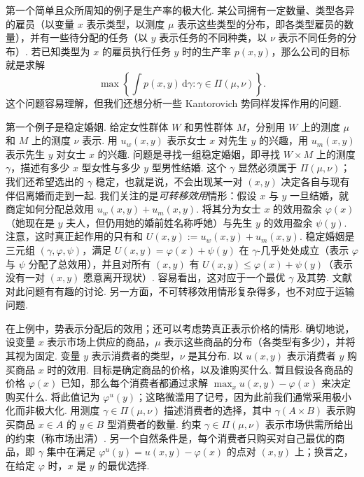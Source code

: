 第一个简单且众所周知的例子是生产率的极大化. 某公司拥有一定数量、类型各异的雇员（以变量 $x$ 表示类型，以测度 $\mu$ 表示这些类型的分布，即各类型雇员的数量），并有一些待分配的任务（以 $y$ 表示任务的不同种类，以 $\nu$ 表示不同任务的分布）. 若已知类型为 $x$ 的雇员执行任务 $y$ 时的生产率 $p(x,y)$，那么公司的目标就是求解
\[
 \max\left\{\int p(x,y)\,\mathrm d\gamma:
                       \gamma\in\Pi(\mu,\nu)\right\}.
\]
这个问题容易理解，但我们还想分析一些 Kantorovich 势同样发挥作用的问题.

\label{idx:i142-p45}
第一个例子是稳定婚姻. 给定女性群体 $W$ 和男性群体 $M$，分别用 $W$ 上的测度 $\mu$ 和 $M$ 上的测度 $\nu$ 表示. 用 $u_w(x,y)$ 表示女士 $x$ 对先生 $y$ 的兴趣，用 $u_m(x,y)$ 表示先生 $y$ 对女士 $x$ 的兴趣. 问题是寻找一组稳定婚姻，即寻找 $W\times M$ 上的测度 $\gamma$，描述有多少 $x$ 型女性与多少 $y$ 型男性结婚. 这个 $\gamma$ 显然必须属于 $\Pi(\mu,\nu)$；我们还希望选出的 $\gamma$ 稳定，也就是说，不会出现某一对 $(x,y)$ 决定各自与现有伴侣离婚而走到一起. 我们关注的是\emph{可转移效用}情形：假设 $x$ 与 $y$ 一旦结婚，就商定如何分配总效用 $u_w(x,y)+u_m(x,y)$. 将其分为女士 $x$ 的效用盈余 $\varphi(x)$（她现在是 $y$ 夫人，但仍用她的婚前姓名称呼她）与先生 $y$ 的效用盈余 $\psi(y)$. 注意，这时真正起作用的只有和 $U(x,y):=u_w(x,y)+u_m(x,y)$. 稳定婚姻是三元组 $(\gamma,\varphi,\psi)$，满足 $U(x,y)=\varphi(x)+\psi(y)$ 在 $\gamma$-几乎处处成立（表示 $\varphi$ 与 $\psi$ 分配了总效用），并且对所有 $(x,y)$ 有 $U(x,y)\leq\varphi(x)+\psi(y)$（表示没有一对 $(x,y)$ 愿意离开现状）. 容易看出，这对应于一个最优 $\gamma$ 及其势. 文献\cite{b125} 对此问题有有趣的讨论. 另一方面，不可转移效用情形复杂得多，也不对应于运输问题.

在上例中，势表示分配后的效用；还可以考虑势真正表示价格的情形. 确切地说，设变量 $x$ 表示市场上供应的商品，$\mu$ 表示这些商品的分布（各类型有多少），并将其视为固定. 变量 $y$ 表示消费者的类型，$\nu$ 是其分布. 以 $u(x,y)$ 表示消费者 $y$ 购买商品 $x$ 时的效用. 目标是确定商品的价格，以及谁购买什么. 暂且假设各商品的价格 $\varphi(x)$ 已知，那么每个消费者都通过求解 $\max_x u(x,y)-\varphi(x)$ 来决定购买什么. 将此值记为 $\varphi^u(y)$；这略微滥用了记号，因为此前我们通常采用极小化而非极大化. 用测度 $\gamma\in\Pi(\mu,\nu)$ 描述消费者的选择，其中 $\gamma(A\times B)$ 表示购买商品 $x\in A$ 的 $y\in B$ 型消费者的数量. 约束 $\gamma\in\Pi(\mu,\nu)$ 表示市场供需所给出的约束（称市场出清）. 另一个自然条件是，每个消费者只购买对自己最优的商品，即 $\gamma$ 集中在满足 $\varphi^u(y)=u(x,y)-\varphi(x)$ 的点对 $(x,y)$ 上；换言之，在给定 $\varphi$ 时，$x$ 是 $y$ 的最优选择.

